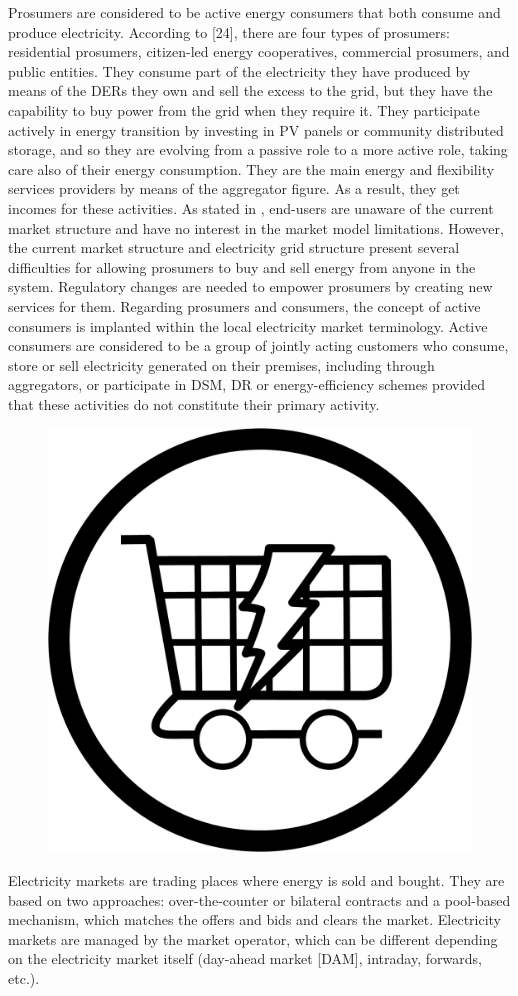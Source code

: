 Prosumers are considered to be active energy consumers that both consume and produce electricity. According to [24], there are four types of prosumers: residential prosumers, citizen-led energy cooperatives, commercial prosumers, and public entities. They consume part of the electricity they have produced by means of the DERs they own and sell the excess to the grid, but they have the capability to buy power from the grid when they require it. They participate actively in energy transition by investing in PV panels or community distributed storage, and so they are evolving from a passive role to a more active role, taking care also of their energy consumption. They are the main energy and flexibility services providers by means of the aggregator figure. As a result, they get incomes for these activities. As stated in \cite{USEFFoundation2015a}, end-users are unaware of the current market structure and have no interest in the market model limitations. However, the current market structure and electricity grid structure present several difficulties for allowing prosumers to buy and sell energy from anyone in the system. Regulatory changes are needed to empower prosumers by creating new services for them. Regarding prosumers and consumers, the concept of active consumers is implanted within the local electricity market terminology. Active consumers are considered to be a group of jointly acting customers who consume, store or sell electricity generated on their premises, including through aggregators, or participate in DSM, DR or energy-efficiency schemes provided that these activities do not constitute their primary activity.\\

\begin{figure}
	\centering
	\includegraphics[width=0.1\columnwidth ]{ChapterIntro/Figures/ElectricityMarket.jpg}
	\label{Electricity Market}  
\end{figure}


Electricity markets are trading places where energy is sold and bought. They are based on two approaches: over-the-counter or bilateral contracts and a pool-based mechanism, which matches the offers and bids and clears the market. Electricity markets are managed by the market operator, which can be different depending on the electricity market itself (day-ahead market [DAM], intraday, forwards, etc.).\\



